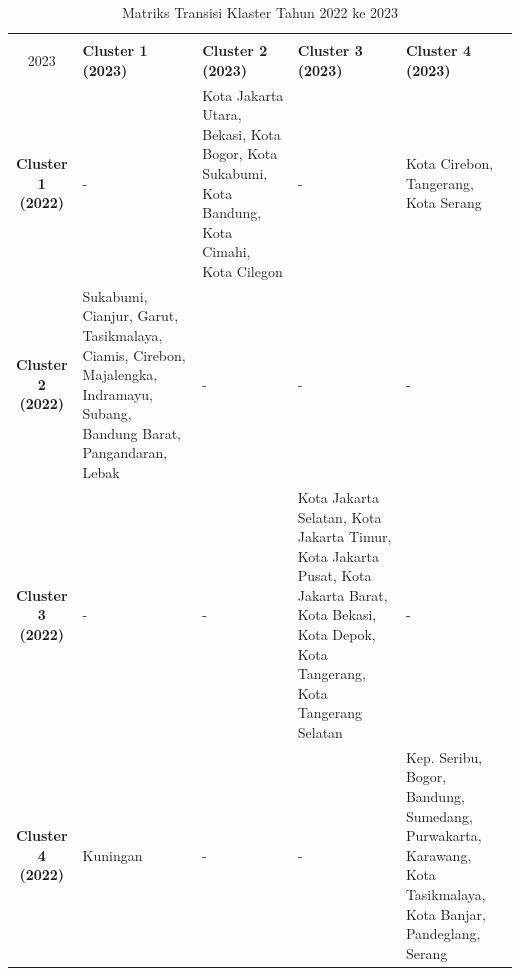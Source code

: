 \begin{table}[H]
\centering
\caption{Matriks Transisi Klaster Tahun 2022 ke 2023} \label{tab:transisi_2022_2023}
\begin{tabular}{|c|p{2cm}|p{2cm}|p{2cm}|p{2cm}|}
\hline
\textbf{Tahun 2022 \\ 2023} & \textbf{Cluster 1 (2023)} & \textbf{Cluster 2 (2023)} & \textbf{Cluster 3 (2023)} & \textbf{Cluster 4 (2023)} \\ \hline
\textbf{Cluster 1 (2022)} & - & Kota Jakarta Utara, Bekasi, Kota Bogor, Kota Sukabumi, Kota Bandung, Kota Cimahi, Kota Cilegon & - & Kota Cirebon, Tangerang, Kota Serang \\ \hline
\textbf{Cluster 2 (2022)} & Sukabumi, Cianjur, Garut, Tasikmalaya, Ciamis, Cirebon, Majalengka, Indramayu, Subang, Bandung Barat, Pangandaran, Lebak & - & - & - \\ \hline
\textbf{Cluster 3 (2022)} & - & - & Kota Jakarta Selatan, Kota Jakarta Timur, Kota Jakarta Pusat, Kota Jakarta Barat, Kota Bekasi, Kota Depok, Kota Tangerang, Kota Tangerang Selatan & - \\ \hline
\textbf{Cluster 4 (2022)} & Kuningan & - & - & Kep. Seribu, Bogor, Bandung, Sumedang, Purwakarta, Karawang, Kota Tasikmalaya, Kota Banjar, Pandeglang, Serang \\ \hline
\end{tabular}
\end{table}